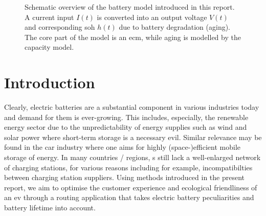 \documentclass{prettytex/ox/mmsc-special-topic}
\title{\topictitle}
\author{Candidate \candidatenumber}
\date{\today}
\begin{document}
  \pagestyle{plain}
  \mmscSpecialHeader[casestudy]

  \begin{abstract}
    \label{abstract}
    This work will attempt to devise a mathematical model for Lithium-Ion batteries (cf. ) and, building on it, a model for an \gls{ev}.
    We implement the model, a first-order system of s, using the system solver functionality of MATLAB as well as a numerical forward integration scheme.
    We will use the implemented numerical simulator to make progress in a complex route finding problem using real-world road network data obtained from \gls{osm}.

    The first part of this report will focus on the model for a Lithium-Ion battery which was the focus of our project. The electrical behaviour was modelled through the Thevenin \gls{ecm}, in which we also considered battery aging effects. The second part is the route finding and optimisation problem in the context of s.

    Our model was implemented in Python and MATLAB and there is a graphical user interface available with it that provides live insight into the model (cf. the screenshot in ).
  \end{abstract}

  \begin{figure}[H]
    \centering
    \caption{Schematic overview of the battery model introduced in this report. A current input $I(t)$ is converted into an output voltage $V(t)$ and corresponding \glsdesc{soh} $h(t)$ due to battery degradation (aging). The core part of the model is an \gls{ecm}, while aging is modelled by the capacity model.}
    \label{fig:model-overview}
  \end{figure}

  \pagebreak
  \pagestyle{normal}

  \section{Introduction}
  Clearly, electric batteries are a substantial component in various industries today and demand for them is ever-growing.
  This includes, especially, the renewable energy sector due to the unpredictability of energy supplies such as wind and solar power where short-term storage is a necessary evil.
  Similar relevance may be found in the car industry where one aims for highly (space-)efficient mobile storage of energy.
  In many countries / regions, s still lack a well-enlarged network of charging stations, for various reasons including for example, incompatibilties between charging station suppliers.
  Using methods introduced in the present report, we aim to optimise the customer experience and ecological friendliness of an \gls{ev} through a routing application that takes electric battery peculiarities and battery lifetime into account.
\end{document}
